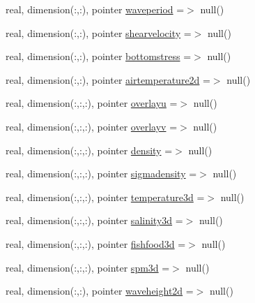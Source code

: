\begin{DoxyCompactItemize}
\item 
real, dimension(\+:,\+:), pointer \mbox{\hyperlink{structmodulelagrangianglobal_1_1t__eulermodel_a70226649ce6157a1e788514e56183e7f}{waveperiod}} =$>$ null()
\item 
real, dimension(\+:,\+:), pointer \mbox{\hyperlink{structmodulelagrangianglobal_1_1t__eulermodel_aa857022146cd657df9103e3304c45704}{shearvelocity}} =$>$ null()
\item 
real, dimension(\+:,\+:), pointer \mbox{\hyperlink{structmodulelagrangianglobal_1_1t__eulermodel_a5ff9607707cfd017793f6cb831562c23}{bottomstress}} =$>$ null()
\item 
real, dimension(\+:,\+:), pointer \mbox{\hyperlink{structmodulelagrangianglobal_1_1t__eulermodel_af4470187811547132bdd90c726fa852c}{airtemperature2d}} =$>$ null()
\item 
real, dimension(\+:,\+:,\+:), pointer \mbox{\hyperlink{structmodulelagrangianglobal_1_1t__eulermodel_a148c18cfb0a059f497492e7927c6a304}{overlayu}} =$>$ null()
\item 
real, dimension(\+:,\+:,\+:), pointer \mbox{\hyperlink{structmodulelagrangianglobal_1_1t__eulermodel_ad07c097de8085450d0fdb0b3163c49f4}{overlayv}} =$>$ null()
\item 
real, dimension(\+:,\+:,\+:), pointer \mbox{\hyperlink{structmodulelagrangianglobal_1_1t__eulermodel_a2a02a1170c380d8a8011c26a4a6b9d67}{density}} =$>$ null()
\item 
real, dimension(\+:,\+:,\+:), pointer \mbox{\hyperlink{structmodulelagrangianglobal_1_1t__eulermodel_aa091e49f4f16eefbf8783f85e87a50ce}{sigmadensity}} =$>$ null()
\item 
real, dimension(\+:,\+:,\+:), pointer \mbox{\hyperlink{structmodulelagrangianglobal_1_1t__eulermodel_ad1934c831c8b84f5816079f9e6df3a79}{temperature3d}} =$>$ null()
\item 
real, dimension(\+:,\+:,\+:), pointer \mbox{\hyperlink{structmodulelagrangianglobal_1_1t__eulermodel_a900d6414b502644f63812f591062fd15}{salinity3d}} =$>$ null()
\item 
real, dimension(\+:,\+:,\+:), pointer \mbox{\hyperlink{structmodulelagrangianglobal_1_1t__eulermodel_aa3600e51dbf3ee4745c5ae05b953d04c}{fishfood3d}} =$>$ null()
\item 
real, dimension(\+:,\+:,\+:), pointer \mbox{\hyperlink{structmodulelagrangianglobal_1_1t__eulermodel_a79cb57e0853c838b0ff533d008387673}{spm3d}} =$>$ null()
\item 
real, dimension(\+:,\+:), pointer \mbox{\hyperlink{structmodulelagrangianglobal_1_1t__eulermodel_a2533868c3a62b8c22ed9dc6bf9896cad}{waveheight2d}} =$>$ null()

\end{DoxyCompactItemize}
